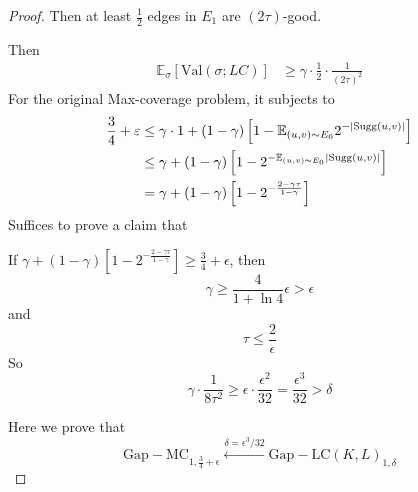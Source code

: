 \begin{proof}
    Then at least  $ \frac{1}{2} $ edges in  $ E_1 $ are  $ (2\tau ) $-good.
    
    Then 
    \[\begin{aligned}
        \mathbb{E}_\sigma\left[\mathrm{Val}(\sigma;LC)\right]& \geq \gamma\cdot\frac{1}{2}\cdot\frac{1}{(2\tau)^2}
    \end{aligned}\]
    For the original Max-coverage problem, it subjects to 
    \[\begin{aligned}
        \frac{3}{4}+\varepsilon& \leq \gamma\cdot 1+(1-\gamma)\left[1-\mathbb E_{(u,v)\sim E_0}2^{-|\mathrm{Sugg}(u,v)|}\right]\\
        & \leq \gamma+(1-\gamma)\left[1-2^{-\mathbb E_{(u,v)\sim E_0}|\mathrm{Sugg}(u,v)|}\right]\\
        &=\gamma+(1-\gamma)\left[1-2^{-\frac{2-\gamma\tau}{1-\gamma}}\right]
    \end{aligned}\]
    Suffices to prove a claim that 
    \begin{claim}
        If  $ \gamma+(1-\gamma)\left[1-2^{-\frac{2-\gamma\tau}{1-\gamma}}\right] \geq \frac{3}{4}+\epsilon $, then 
        \[\gamma \geq \frac{4}{1+\ln 4}\epsilon>\epsilon\]
        and 
        \[\tau \leq \frac{2}{\epsilon}\]
        So 
        \[\gamma\cdot\frac{1}{8\tau^2} \geq \epsilon\cdot\frac{\epsilon^2}{32}=\frac{\epsilon^3}{32}>\delta\]
    \end{claim}
    Here we prove that 
    \[\mathrm{Gap-MC}_{1,\frac{3}{4}+\epsilon}\xleftarrow{\delta=\epsilon^3/32}\mathrm{Gap-LC}(K,L)_{1,\delta}\]
\end{proof}